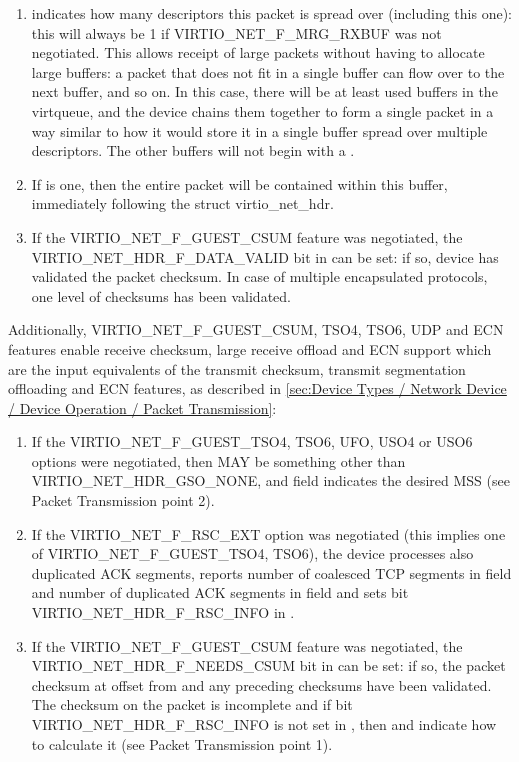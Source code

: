 \begin{enumerate}
\item {} indicates how many descriptors
  this packet is spread over (including this one): this will
  always be 1 if VIRTIO_NET_F_MRG_RXBUF was not negotiated.
  This allows receipt of large packets without having to allocate large
  buffers: a packet that does not fit in a single buffer can flow
  over to the next buffer, and so on. In this case, there will be
  at least  used buffers in the virtqueue, and the device
  chains them together to form a single packet in a way similar to
  how it would store it in a single buffer spread over multiple
  descriptors.
  The other buffers will not begin with a .

\item If
   is one, then the entire packet will be
  contained within this buffer, immediately following the struct
  virtio_net_hdr.
\item If the VIRTIO_NET_F_GUEST_CSUM feature was negotiated, the
  VIRTIO_NET_HDR_F_DATA_VALID bit in  can be
  set: if so, device has validated the packet checksum.
  In case of multiple encapsulated protocols, one level of checksums
  has been validated.
\end{enumerate}

Additionally, VIRTIO_NET_F_GUEST_CSUM, TSO4, TSO6, UDP and ECN
features enable receive checksum, large receive offload and ECN
support which are the input equivalents of the transmit checksum,
transmit segmentation offloading and ECN features, as described
in \ref{sec:Device Types / Network Device / Device Operation /
Packet Transmission}:
\begin{enumerate}
\item If the VIRTIO_NET_F_GUEST_TSO4, TSO6, UFO, USO4 or USO6 options were
  negotiated, then  MAY be something other than
  VIRTIO_NET_HDR_GSO_NONE, and  field indicates the
  desired MSS (see Packet Transmission point 2).
\item If the VIRTIO_NET_F_RSC_EXT option was negotiated (this
  implies one of VIRTIO_NET_F_GUEST_TSO4, TSO6), the
  device processes also duplicated ACK segments, reports
  number of coalesced TCP segments in  field and
  number of duplicated ACK segments in  field
  and sets bit VIRTIO_NET_HDR_F_RSC_INFO in .
\item If the VIRTIO_NET_F_GUEST_CSUM feature was negotiated, the
  VIRTIO_NET_HDR_F_NEEDS_CSUM bit in  can be
  set: if so, the packet checksum at offset 
  from  and any preceding checksums
  have been validated.  The checksum on the packet is incomplete and
  if bit VIRTIO_NET_HDR_F_RSC_INFO is not set in ,
  then  and  indicate how to calculate it
  (see Packet Transmission point 1).

\end{enumerate}

